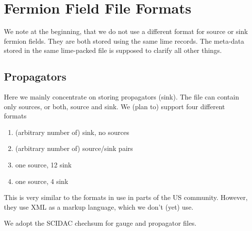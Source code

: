 \section{Fermion Field File Formats}

We note at the beginning, that we do not use a different format for
source or sink fermion fields. They are both stored using the same
lime records. The meta-data stored in the same lime-packed file is
supposed to clarify all other things.

\subsection{Propagators}

Here we mainly concentrate on storing propagators (sink). The file can
contain only sources, or both, source and sink. We (plan to) support
four different formats
\begin{enumerate}
\item (arbitrary number of) sink, no sources
\item (arbitrary number of) source/sink pairs
\item one source, 12 sink
\item one source, 4 sink
\end{enumerate}
This is very similar to the formats in use in parts of the US
community. However, they use XML as a markup language, which we don't
(yet) use.

We adopt the SCIDAC chechsum for gauge and propagator files.

